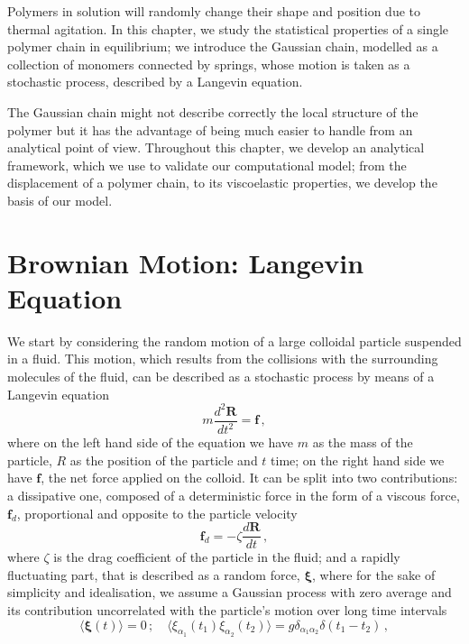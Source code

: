 \documentclass[../../main.tex]{subfiles}
\begin{document}
%
    Polymers in solution will randomly change their shape and position due to thermal agitation. In this chapter, we study the statistical properties of a single polymer chain in equilibrium; we introduce the Gaussian chain, modelled as a collection of monomers connected by springs, whose motion is taken as a stochastic process, described by a Langevin equation.
    
    The Gaussian chain might not describe correctly the local structure of the polymer but it has the advantage of being much easier to handle from an analytical point of view. Throughout this chapter, we develop an analytical framework, which we use to validate our computational model; from the displacement of a polymer chain, to its viscoelastic properties, we develop the basis of our model.


%
\section{Brownian Motion: Langevin Equation}\label{Section: Brownian Motion}
    We start by considering the random motion of a large colloidal particle suspended in a fluid. This motion, which results from the collisions with the surrounding molecules of the fluid, can be described as a stochastic process by means of a Langevin equation
        \begin{equation}\label{eq: Brownian Motion - Langevin Equation}
            m\frac{d^2\mathbf{R}}{dt^2} = \mathbf{f} \,,
        \end{equation}
    where on the left hand side of the equation we have $m$ as the mass of the particle, $R$ as the position of the particle and $t$ time; on the right hand side we have $\mathbf{f}$, the net force applied on the colloid. It can be split into two contributions: a dissipative one, composed of a deterministic force in the form of a viscous force, $\mathbf{f}_d$, proportional and opposite to the particle velocity
        \begin{equation}\label{eq: Brownian Motion - Drag Force}
            \mathbf{f}_d = -\zeta \frac{d\mathbf{R}}{dt} \,,
        \end{equation}
    where $\zeta$ is the drag coefficient of the particle in the fluid; and a rapidly fluctuating part, that is described as a random force, $\bm{\xi}$, where for the sake of simplicity and idealisation, we assume a Gaussian process with zero average and its contribution uncorrelated with the particle's motion over long time intervals
    \begin{equation}\label{eq: Brownian Motion - Random Force}
        \langle \bm{\xi}(t) \rangle = 0 \,; \quad \langle \xi_{\alpha_1}(t_1) \xi_{\alpha_2}(t_2) \rangle = g\delta_{{\alpha_1}{\alpha_2}}\delta(t_1 - t_2) \,,
    \end{equation}
\end{document}
